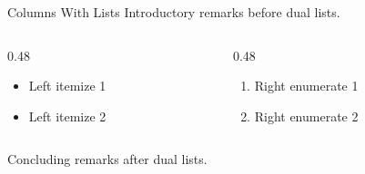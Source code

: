 \documentclass[14pt,t]{beamer}
\begin{document}
\begin{frame}{Columns With Lists}
Introductory remarks before dual lists.

\begin{columns}[T]
\begin{column}{0.48\textwidth}
\begin{itemize}
\item Left itemize 1
\item Left itemize 2
\end{itemize}
\end{column}
\begin{column}{0.48\textwidth}
\begin{enumerate}
\item Right enumerate 1
\item Right enumerate 2
\end{enumerate}
\end{column}
\end{columns}

Concluding remarks after dual lists.
\end{frame}
\end{document}
